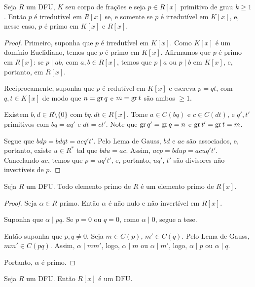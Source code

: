     \begin{prop}
        Seja $R$ um DFU, $K$ seu corpo de frações e seja $p\in R[x]$ primitivo de grau $k\geq 1$.
        Então $p$ é irredutível em $R[x]$ se, e somente se $p$ é irredutível em $K[x]$, e, nesse caso, $p$ é primo em $K[x]$ e $R[x]$.
    \end{prop}
    \begin{proof}
        Primeiro, suponha que $p$ é irredutível em $K[x]$. Como $K[x]$ é um domínio Euclidiano, temos que $p$ é primo em $K[x]$. Afirmamos que $p$ é primo em $R[x]$: se $p\mid ab$, com $a, b \in R[x]$, temos que $p\mid a$ ou $p\mid b$ em $K[x]$, e, portanto, em $R[x]$.

        Reciprocamente, suponha que $p$ é redutível em $K[x]$ e escreva $p=qt$, com $q, t \in K[x]$ de modo que $n=\operatorname{gr} q$ e $m=\operatorname{gr} t$ são ambos $\geq 1$.

        Existem $b, d\in R\setminus \{0\}$ com $bq, dt \in R[x]$. Tome $a \in C(bq)$ e $c \in C(dt)$, e $q', t'$ primitivos com $bq=aq'$ e $dt=ct'$.
        Note que $\operatorname{gr} q'=\operatorname{gr} q=n$ e $\operatorname{gr} t'=\operatorname{gr} t=m$.

        Segue que $bdp=bdqt=acq't'$. Pelo Lema de Gauss, $bd$ e $ac$ são associados, e, portanto, existe $u \in R^*$ tal que $bdu=ac$. Assim, $acp=bdup=acuq't'$. Cancelando $ac$, temos que $p=uq't'$, e, portanto, $uq'$, $t'$ são divisores não invertíveis de $p$.
    \end{proof}
    \begin{lemma}
    Seja $R$ um DFU. Todo elemento primo de $R$ é um elemento primo de $R[x]$.
    \end{lemma}
    \begin{proof}
        Seja $\alpha \in R$ primo. Então $\alpha$ é não nulo e não invertível em $R[x]$.

        Suponha que $\alpha\mid pq$.
        Se $p=0$ ou $q=0$, como $\alpha\mid 0$, segue a tese.
        
        Então suponha que $p, q \neq 0$. Seja $m\in C(p)$, $m'\in C(q)$. Pelo Lema de Gauss, $mm'\in C(pq)$. Assim, $\alpha\mid mm'$, logo, $\alpha\mid m$ ou $\alpha\mid m'$, logo, $\alpha\mid p$ ou $\alpha\mid q$.

        Portanto, $\alpha$ é primo.
    \end{proof}
    \begin{prop}
        Seja $R$ um DFU. Então $R[x]$ é um DFU.
    \end{prop}
